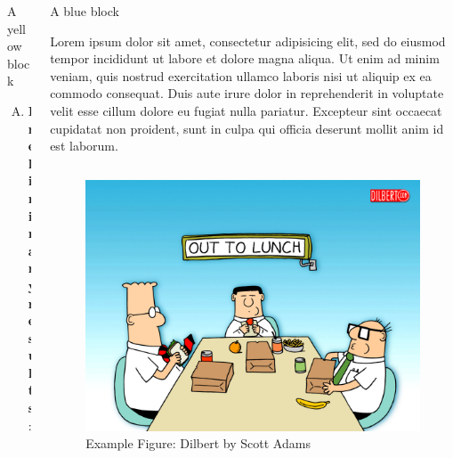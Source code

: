 \documentclass[final]{beamer}
\begin{document}
\begin{frame}{}
\begin{columns}[t]
\begin{column}{.3\linewidth}
\begin{problockYellow}{A yellow block}
\begin{enumerate}[A.]
\item \textbf{Preliminary results}: 


\end{enumerate}

\end{problockYellow}
\end{column}

\begin{column}{.3\linewidth}

\begin{problockBlue}{A blue block}

Lorem ipsum dolor sit amet, consectetur adipisicing elit, sed do eiusmod tempor incididunt ut labore et dolore magna aliqua. Ut enim ad minim veniam, quis nostrud exercitation ullamco laboris nisi ut aliquip ex ea commodo consequat. Duis aute irure dolor in reprehenderit in voluptate velit esse cillum dolore eu fugiat nulla pariatur. Excepteur sint occaecat cupidatat non proident, sunt in culpa qui officia deserunt mollit anim id est laborum.

\begin{columns}[c]

\begin{figure}[ht]
\begin{center}
	\includegraphics[width=\textwidth]{./images/dilbert.jpg}
	\caption{Example Figure: Dilbert by Scott Adams}
\end{center}
\end{figure}


\end{columns}
\end{problockBlue}
\end{column}
\end{columns}
\end{frame}
\end{document}
